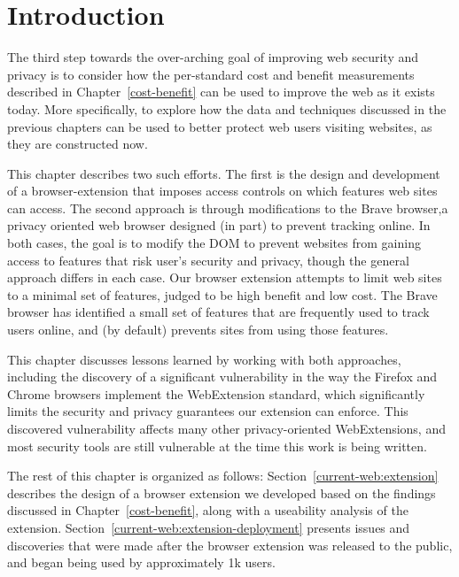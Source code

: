 \section{Introduction}
\label{current-web:current-web}

The third step towards the over-arching goal of improving web security and
privacy is to consider how the per-standard cost and benefit measurements
described in Chapter~\ref{cost-benefit} can be used to improve the web as it
exists today.  More specifically, to explore how the data and techniques
discussed in the previous chapters can be used to better protect web users
visiting websites, as they are constructed now.

This chapter describes two such efforts.  The first is the design and development
of a browser-extension that imposes access controls on which \WAPI features
web sites can access.  The second approach is through modifications to the Brave
browser,a privacy oriented web browser designed (in part) to prevent tracking online.
In both cases, the goal is to modify the DOM to prevent websites from gaining
access to features that risk user's security and privacy, though the general
approach differs in each case. Our browser extension attempts to limit web
sites to a minimal set of features, judged to be high benefit and low cost.
The Brave browser has identified a small set of \WAPI features that
are frequently used to track users online, and (by default) prevents sites
from using those features.

This chapter discusses lessons learned by working with both approaches, including
the discovery of a significant vulnerability in the way the Firefox and Chrome
browsers implement the WebExtension standard, which significantly limits
the security and privacy guarantees our extension can enforce.  This discovered
vulnerability affects many other privacy-oriented WebExtensions, and most
security tools are still vulnerable at the time this work is being written.

The rest of this chapter is organized as follows:  Section~\ref{current-web:extension}
describes the design of a browser extension we developed based on the findings
discussed in Chapter~\ref{cost-benefit}, along with a useability analysis of
the extension.  Section~\ref{current-web:extension-deployment} presents
issues and discoveries that were made after the browser extension was released
to the public, and began being used by approximately 1k users.
